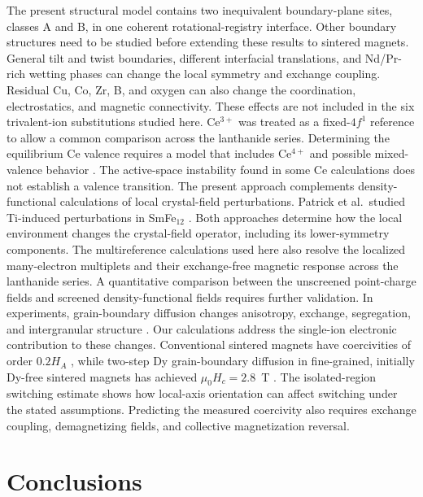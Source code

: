 \documentclass[final,1p,times]{elsarticle}
\DeclareRobustCommand{\rev}[1]{{\color{revcolor}#1}}
\begin{document}
\rev{The present structural model contains two inequivalent boundary-plane sites, classes A and B, in one coherent rotational-registry interface. Other boundary structures need to be studied before extending these results to sintered magnets. General tilt and twist boundaries, different interfacial translations, and Nd/Pr-rich wetting phases can change the local symmetry and exchange coupling. Residual Cu, Co, Zr, B, and oxygen can also change the coordination, electrostatics, and magnetic connectivity. These effects are not included in the six trivalent-ion substitutions studied here. Ce$^{3+}$ was treated as a fixed-$4f^1$ reference to allow a common comparison across the lanthanide series. Determining the equilibrium Ce valence requires a model that includes Ce$^{4+}$ and possible mixed-valence behavior \cite{capehart1993,alam2013}. The active-space instability found in some Ce calculations does not establish a valence transition.} \rev{The present approach complements density-functional calculations of local crystal-field perturbations. Patrick et al.\ studied Ti-induced perturbations in SmFe$_{12}$ \cite{patrick2024}. Both approaches determine how the local environment changes the crystal-field operator, including its lower-symmetry components. The multireference calculations used here also resolve the localized many-electron multiplets and their exchange-free magnetic response across the lanthanide series. A quantitative comparison between the unscreened point-charge fields and screened density-functional fields requires further validation. In experiments, grain-boundary diffusion changes anisotropy, exchange, segregation, and intergranular structure \cite{hono2012,sepehriamin2013,sepehriamin2023}. Our calculations address the single-ion electronic contribution to these changes. Conventional sintered magnets have coercivities of order $0.2H_A$ \cite{hono2012}, while two-step Dy grain-boundary diffusion in fine-grained, initially Dy-free sintered magnets has achieved $\mu_0H_c=2.8$~T \cite{sepehriamin2023}. The isolated-region switching estimate shows how local-axis orientation can affect switching under the stated assumptions. Predicting the measured coercivity also requires exchange coupling, demagnetizing fields, and collective magnetization reversal.}


\section{Conclusions}
\end{document}
